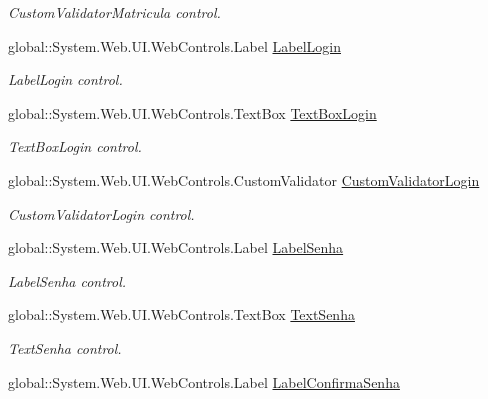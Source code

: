 \begin{DoxyCompactItemize}
\begin{DoxyCompactList}\small\item\em CustomValidatorMatricula control. \item\end{DoxyCompactList}\item 
global::System.Web.UI.WebControls.Label \hyperlink{class_sistema_r_h_1_1_cadastro_user_a886a753f3edbe32db892c14f54480907}{LabelLogin}
\begin{DoxyCompactList}\small\item\em LabelLogin control. \item\end{DoxyCompactList}\item 
global::System.Web.UI.WebControls.TextBox \hyperlink{class_sistema_r_h_1_1_cadastro_user_a8379e624d20a34d9c20a2d3f4d1682f9}{TextBoxLogin}
\begin{DoxyCompactList}\small\item\em TextBoxLogin control. \item\end{DoxyCompactList}\item 
global::System.Web.UI.WebControls.CustomValidator \hyperlink{class_sistema_r_h_1_1_cadastro_user_a399f5701c728310d19ac0885208f581b}{CustomValidatorLogin}
\begin{DoxyCompactList}\small\item\em CustomValidatorLogin control. \item\end{DoxyCompactList}\item 
global::System.Web.UI.WebControls.Label \hyperlink{class_sistema_r_h_1_1_cadastro_user_aa130d6fb4abf5d140e894524e5190ef3}{LabelSenha}
\begin{DoxyCompactList}\small\item\em LabelSenha control. \item\end{DoxyCompactList}\item 
global::System.Web.UI.WebControls.TextBox \hyperlink{class_sistema_r_h_1_1_cadastro_user_a14b49b07f7bd5643d72c04cd3edc3f4b}{TextSenha}
\begin{DoxyCompactList}\small\item\em TextSenha control. \item\end{DoxyCompactList}\item 
global::System.Web.UI.WebControls.Label \hyperlink{class_sistema_r_h_1_1_cadastro_user_a126707960e75632de045def06f799c54}{LabelConfirmaSenha}

\end{DoxyCompactItemize}
